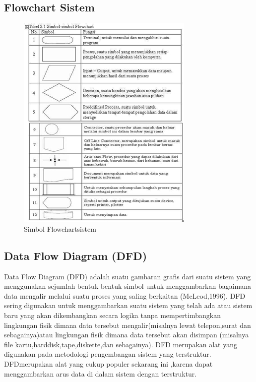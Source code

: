\documentclass{jtetiproposalskripsi}
\begin{document}
\subsection{Flowchart Sistem}
 \begin{figure}[ht!]
  \centering
    \includegraphics{gambar/lin}
    \caption{Simbol Flowchartsistem}
    \label{lin}
\end{figure}


\subsection{Data Flow Diagram (DFD)}
		Data Flow Diagram (DFD) adalah suatu gambaran grafis dari suatu sistem yang menggunakan sejumlah bentuk-bentuk simbol untuk menggambarkan bagaimana data mengalir melalui suatu proses yang saling berkaitan (McLeod,1996).
		DFD sering digunakan untuk menggambarkan suatu sistem yang telah ada atau sistem baru yang akan dikembangkan secara logika tanpa mempertimbangkan lingkungan fisik dimana data tersebut mengalir(misalnya lewat telepon,surat dan sebagainya)atau lingkungan fisik dimana data tersebut akan disimpan (misalnya file kartu,harddisk,tape,diskette,dan sebagainya). DFD merupakan alat yang digunakan pada metodologi pengembangan sistem yang terstruktur. DFDmerupakan alat  yang cukup populer sekarang ini ,karena dapat menggambarkan arus data di dalam sistem dengan terstruktur.
\end{document}

